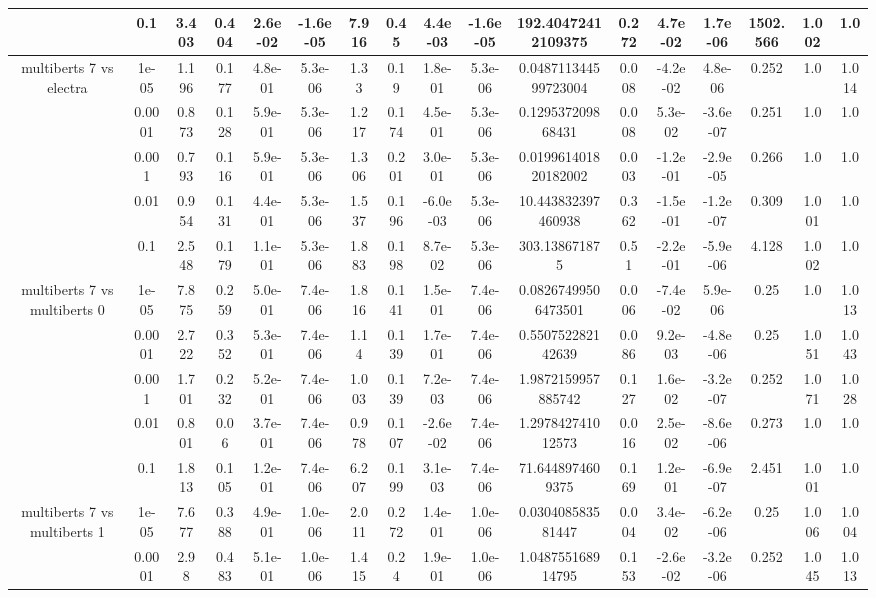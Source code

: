 \begin{tabular}{|c|c|c|c|c|c|c|c|c|c|c|c|c|c|c|c|c|}
 & 0.1 & 3.403 & 0.404 & 2.6e-02 & -1.6e-05 & 7.916 & 0.45 & 4.4e-03 & -1.6e-05 & 192.40472412109375 & 0.272 & 4.7e-02 & 1.7e-06 & 1502.566 & 1.002 & 1.0 \\
\hline
\multirow{5}{*}{multiberts 7 vs electra } & 1e-05 & 1.196 & 0.177 & 4.8e-01 & 5.3e-06 & 1.33 & 0.19 & 1.8e-01 & 5.3e-06 & 0.048711344599723004 & 0.008 & -4.2e-02 & 4.8e-06 & 0.252 & 1.0 & 1.014 \\
 & 0.0001 & 0.873 & 0.128 & 5.9e-01 & 5.3e-06 & 1.217 & 0.174 & 4.5e-01 & 5.3e-06 & 0.129537209868431 & 0.008 & 5.3e-02 & -3.6e-07 & 0.251 & 1.0 & 1.0 \\
 & 0.001 & 0.793 & 0.116 & 5.9e-01 & 5.3e-06 & 1.306 & 0.201 & 3.0e-01 & 5.3e-06 & 0.019961401820182002 & 0.003 & -1.2e-01 & -2.9e-05 & 0.266 & 1.0 & 1.0 \\
 & 0.01 & 0.954 & 0.131 & 4.4e-01 & 5.3e-06 & 1.537 & 0.196 & -6.0e-03 & 5.3e-06 & 10.443832397460938 & 0.362 & -1.5e-01 & -1.2e-07 & 0.309 & 1.001 & 1.0 \\
 & 0.1 & 2.548 & 0.179 & 1.1e-01 & 5.3e-06 & 1.883 & 0.198 & 8.7e-02 & 5.3e-06 & 303.138671875 & 0.51 & -2.2e-01 & -5.9e-06 & 4.128 & 1.002 & 1.0 \\
\hline
\multirow{5}{*}{multiberts 7 vs multiberts 0} & 1e-05 & 7.875 & 0.259 & 5.0e-01 & 7.4e-06 & 1.816 & 0.141 & 1.5e-01 & 7.4e-06 & 0.08267499506473501 & 0.006 & -7.4e-02 & 5.9e-06 & 0.25 & 1.0 & 1.013 \\
 & 0.0001 & 2.722 & 0.352 & 5.3e-01 & 7.4e-06 & 1.14 & 0.139 & 1.7e-01 & 7.4e-06 & 0.550752282142639 & 0.086 & 9.2e-03 & -4.8e-06 & 0.25 & 1.051 & 1.043 \\
 & 0.001 & 1.701 & 0.232 & 5.2e-01 & 7.4e-06 & 1.003 & 0.139 & 7.2e-03 & 7.4e-06 & 1.9872159957885742 & 0.127 & 1.6e-02 & -3.2e-07 & 0.252 & 1.071 & 1.028 \\
 & 0.01 & 0.801 & 0.06 & 3.7e-01 & 7.4e-06 & 0.978 & 0.107 & -2.6e-02 & 7.4e-06 & 1.297842741012573 & 0.016 & 2.5e-02 & -8.6e-06 & 0.273 & 1.0 & 1.0 \\
 & 0.1 & 1.813 & 0.105 & 1.2e-01 & 7.4e-06 & 6.207 & 0.199 & 3.1e-03 & 7.4e-06 & 71.6448974609375 & 0.169 & 1.2e-01 & -6.9e-07 & 2.451 & 1.001 & 1.0 \\
\hline
\multirow{5}{*}{multiberts 7 vs multiberts 1} & 1e-05 & 7.677 & 0.388 & 4.9e-01 & 1.0e-06 & 2.011 & 0.272 & 1.4e-01 & 1.0e-06 & 0.030408583581447 & 0.004 & 3.4e-02 & -6.2e-06 & 0.25 & 1.006 & 1.004 \\
 & 0.0001 & 2.98 & 0.483 & 5.1e-01 & 1.0e-06 & 1.415 & 0.24 & 1.9e-01 & 1.0e-06 & 1.048755168914795 & 0.153 & -2.6e-02 & -3.2e-06 & 0.252 & 1.045 & 1.013 \\

\end{tabular}
